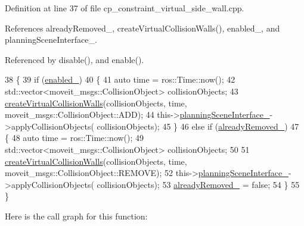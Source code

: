 Definition at line 37 of file cp\+\_\+constraint\+\_\+virtual\+\_\+side\+\_\+wall.\+cpp.



References already\+Removed\+\_\+, create\+Virtual\+Collision\+Walls(), enabled\+\_\+, and planning\+Scene\+Interface\+\_\+.



Referenced by disable(), and enable().


\begin{DoxyCode}
38         \{
39             \textcolor{keywordflow}{if} (\hyperlink{classsm__moveit__wine__serve_1_1cl__move__group__interface_1_1CpConstraintVirtualSideWall_a41d715b981297010db4d8760244b2e8c}{enabled\_})
40             \{
41                 \textcolor{keyword}{auto} time = ros::Time::now();
42                 std::vector<moveit\_msgs::CollisionObject> collisionObjects;
43                 \hyperlink{classsm__moveit__wine__serve_1_1cl__move__group__interface_1_1CpConstraintVirtualSideWall_a98576104cf4c349341031848477b2d5b}{createVirtualCollisionWalls}(collisionObjects, time, 
      moveit\_msgs::CollisionObject::ADD);
44                 this->\hyperlink{classsm__moveit__wine__serve_1_1cl__move__group__interface_1_1CpConstraintVirtualSideWall_ae3bb8a018ebf8b85621e23f4093a07e9}{planningSceneInterface\_}->applyCollisionObjects(
      collisionObjects);
45             \}
46             \textcolor{keywordflow}{else} \textcolor{keywordflow}{if} (\hyperlink{classsm__moveit__wine__serve_1_1cl__move__group__interface_1_1CpConstraintVirtualSideWall_a18d4b515ae9f0ce6478f9e205431f06d}{alreadyRemoved\_})
47             \{
48                 \textcolor{keyword}{auto} time = ros::Time::now();
49                 std::vector<moveit\_msgs::CollisionObject> collisionObjects;
50 
51                 \hyperlink{classsm__moveit__wine__serve_1_1cl__move__group__interface_1_1CpConstraintVirtualSideWall_a98576104cf4c349341031848477b2d5b}{createVirtualCollisionWalls}(collisionObjects, time, 
      moveit\_msgs::CollisionObject::REMOVE);
52                 this->\hyperlink{classsm__moveit__wine__serve_1_1cl__move__group__interface_1_1CpConstraintVirtualSideWall_ae3bb8a018ebf8b85621e23f4093a07e9}{planningSceneInterface\_}->applyCollisionObjects(
      collisionObjects);
53                 \hyperlink{classsm__moveit__wine__serve_1_1cl__move__group__interface_1_1CpConstraintVirtualSideWall_a18d4b515ae9f0ce6478f9e205431f06d}{alreadyRemoved\_} = \textcolor{keyword}{false};
54             \}
55         \}
\end{DoxyCode}
Here is the call graph for this function\+:

